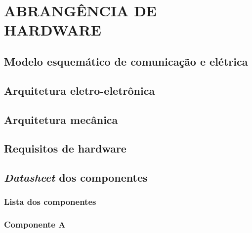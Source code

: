 \chapter{ABRANGÊNCIA DE HARDWARE}
\label{chap:abrhw}

\section{Modelo esquemático de comunicação e elétrica}
\label{sec:modesq}

\section{Arquitetura eletro-eletrônica}
\label{sec:arqelet}

\section{Arquitetura mecânica}
\label{sec:arqmec}

\section{Requisitos de hardware}
\label{sec:reqhw}

\section{\textit{Datasheet} dos componentes}
\label{sec:dtcomp}

\subsection{Lista dos componentes}
\label{sec:lstcomp}

\subsection{Componente A}
\label{sec:comp-a}

